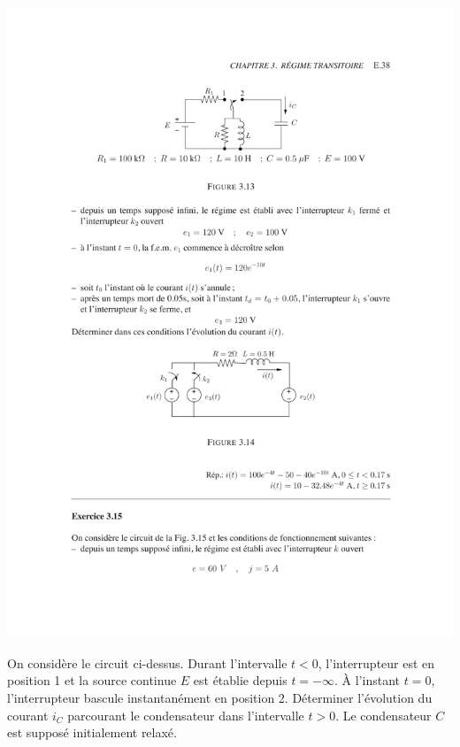 \begin{exercise}{}
	\label{ex:2-13}
	\begin{center}
		\includegraphics[width=\linewidth]{exercices/ex-3-13}
	\end{center}
	On consid\`ere le circuit ci-dessus. Durant
	l'intervalle $t<0$, l'interrupteur est en position 1 et la source
	continue $E$ est \'etablie depuis $t=-\infty$. \`A l'instant $t=0$,
	l'interrupteur bascule instantan\'ement en position 2. D\'eterminer
	l'\'evolution du courant $i_C$ parcourant le condensateur dans
	l'intervalle $t>0$. Le condensateur $C$ est suppos\'e initialement
	relax\'e.
	
\end{exercise}

